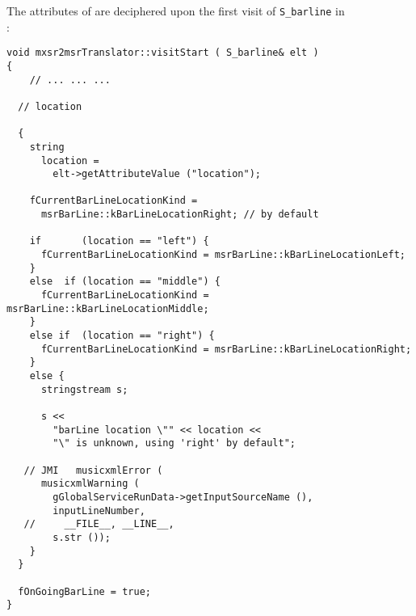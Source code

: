 The attributes of  are deciphered upon the first visit of {\tt S_barline} in\\
:%
\begin{lstlisting}[language=CPlusPlus]
void mxsr2msrTranslator::visitStart ( S_barline& elt )
{
	// ... ... ...

  // location

  {
    string
      location =
        elt->getAttributeValue ("location");

    fCurrentBarLineLocationKind =
      msrBarLine::kBarLineLocationRight; // by default

    if       (location == "left") {
      fCurrentBarLineLocationKind = msrBarLine::kBarLineLocationLeft;
    }
    else  if (location == "middle") {
      fCurrentBarLineLocationKind = msrBarLine::kBarLineLocationMiddle;
    }
    else if  (location == "right") {
      fCurrentBarLineLocationKind = msrBarLine::kBarLineLocationRight;
    }
    else {
      stringstream s;

      s <<
        "barLine location \"" << location <<
        "\" is unknown, using 'right' by default";

   // JMI   musicxmlError (
      musicxmlWarning (
        gGlobalServiceRunData->getInputSourceName (),
        inputLineNumber,
   //     __FILE__, __LINE__,
        s.str ());
    }
  }

  fOnGoingBarLine = true;
}
\end{lstlisting}

